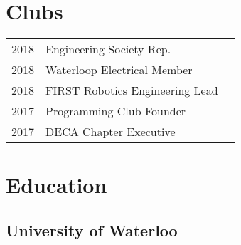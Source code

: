 \documentclass[]{chandan-cv}
\begin{document}
\begin{minipage}[t]{0.33\textwidth}

\section{Clubs}
\begin{tabular}{rll}
2018		&	Engineering Society Rep.\\
2018		&	Waterloop Electrical Member\\
2018		&	FIRST Robotics Engineering Lead\\
2017		&	Programming Club Founder\\
2017		&	DECA Chapter Executive\\
\end{tabular}
\sectionsep



\section{Education}

\subsection{University of Waterloo}
\sectionsep


%
%

\end{minipage}
\hfill
\end{document}
